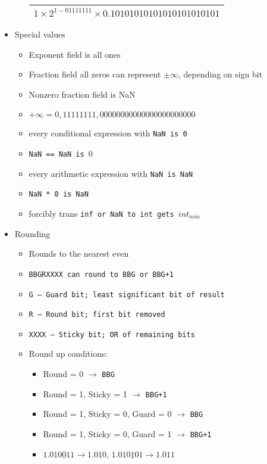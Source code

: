 \begin{itemize}[noitemsep, topsep=1pt]
\begin{itemize}[noitemsep, topsep=1pt]
\begin{tabular}{|c|c|c|}
            \multicolumn{3}{|c|}{$1\times 2^{1-01111111}\times 0.10101010101010101010101$}\\ \hline
            \end{tabular} 
    \end{itemize}
    \item Special values
    \begin{itemize}[noitemsep, topsep=1pt]
        \item Exponent field is all ones
        \item Fraction field all zeros can represent $\pm \infty$, depending on sign bit
        \item Nonzero fraction field is NaN
        \item $+\infty=0,11111111,00000000000000000000000$
        \item every conditional expression with \tt{NaN} is 0
        \item \tt{NaN == NaN} is $0$
        \item every arithmetic expression with \tt{NaN} is \tt{NaN}
        \item \tt{NaN * 0} is \tt{NaN}
        \item forcibly trans \tt{inf} or \tt{NaN} to \tt{int} gets $int_{min}$
    \end{itemize}
    \item Rounding
    \begin{itemize}[noitemsep, topsep=1pt]
        \item Rounds to the nearest even
        \item \tt{BBGRXXXX} can round to \tt{BBG} or \tt{BBG+1}
        \item \tt{G} -- Guard bit; least significant bit of result
        \item \tt{R} -- Round bit; first bit removed
        \item \tt{XXXX} -- Sticky bit; OR of remaining bits
        \item Round up conditions:
        \begin{itemize}[noitemsep, topsep=1pt]
            \item Round = 0 $\to$ \tt{BBG}
            \item Round = 1, Sticky = 1 $\to$ \tt{BBG+1}
            \item Round = 1, Sticky = 0, Guard = 0 $\to$ \tt{BBG}
            \item Round = 1, Sticky = 0, Guard = 1 $\to$ \tt{BBG+1}
            \item $1.010\underline{0}11 \to 1.010$, $1.010\underline{1}01 \to 1.011$

\end{itemize}
\end{itemize}
\end{itemize}
